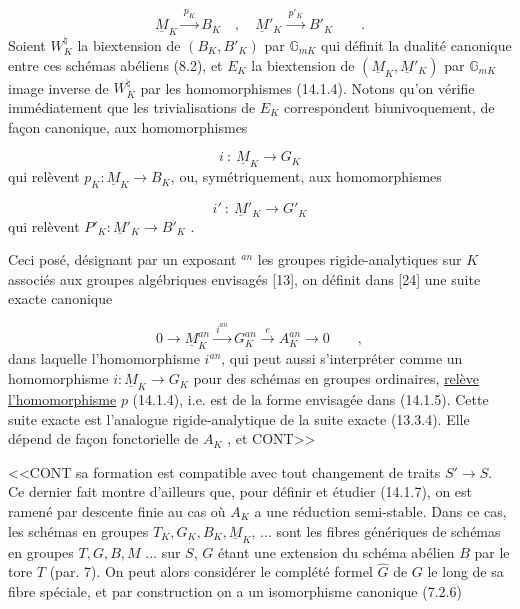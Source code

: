 \begin{equation}\tag{14.1.4}
\underline{M}_K \xrightarrow{\ p_K\ } B_K \quad , \quad \underline{M}'_K \xrightarrow{\ p'_K\ } B'_K \qquad .
\end{equation}
Soient $W_K^{\natural}$ la biextension de $(B_K,B'_K)$ par $\mathbb{G}_{mK}$ qui définit la dualité canonique entre ces schémas abéliens (8.2), et $E_K$ la biextension de $(\underline{M}_K,\underline{M}'_K)$ par $\mathbb{G}_{mK}$ image inverse de $W_K^{\natural}$ par les homomorphismes (14.1.4). Notons qu'on vérifie immédiatement que les trivialisations de $E_K$ correspondent biunivoquement, de façon canonique, aux homomorphismes

\begin{equation}\tag{14.1.5}
i \ : \ \underline{M}_K \longrightarrow G_K
\end{equation}
qui relèvent $p_K : \underline{M}_K \longrightarrow B_K$, ou, symétriquement, aux homomorphismes

\begin{equation}\tag{14.1.6}
i' \ : \ \underline{M}'_K \longrightarrow G'_K
\end{equation}
qui relèvent $P'_K : \underline{M}'_K \longrightarrow B'_K$ .

Ceci posé, désignant par un exposant ${}^{an}$ les groupes rigide-analytiques sur $K$ associés aux groupes algébriques envisagés [13], on définit dans [24] une suite exacte canonique

\begin{equation}\tag{14.1.7}
0 \longrightarrow \underline{M}_K^{an} \xrightarrow{\ i^{an}\ } G_K^{an} \xrightarrow{\ e\ } A_K^{an} \longrightarrow 0 \qquad ,
\end{equation}
dans laquelle l'homomorphisme $i^{an}$, qui peut aussi s'interpréter comme un homomorphisme $i: \underline{M}_K \longrightarrow G_K$ pour des schémas en groupes ordinaires, \underline{relève l'homomorphisme} $p$ (14.1.4), i.e. est de la forme envisagée dans (14.1.5). Cette suite exacte est l'analogue rigide-analytique de la suite exacte (13.3.4). Elle dépend de façon fonctorielle de $A_K$ , et CONT>>



<<CONT sa formation est compatible avec tout changement de traits $S' \longrightarrow S$. Ce dernier fait montre d'ailleurs que, pour définir et étudier (14.1.7), on est ramené par descente finie au cas où $A_K$ a une réduction semi-stable. Dans ce cas, les schémas en groupes $T_K,G_K,B_K,\underline{M}_K$, ... sont les fibres génériques de schémas en groupes $T,G,B,M$ ... sur $S$, $G$ étant une extension du schéma abélien $B$ par le tore $T$ (par. 7). On peut alors considérer le complété formel $\hat{G}$ de $G$ le long de sa fibre spéciale, et par construction on a un isomorphisme canonique (7.2.6)

